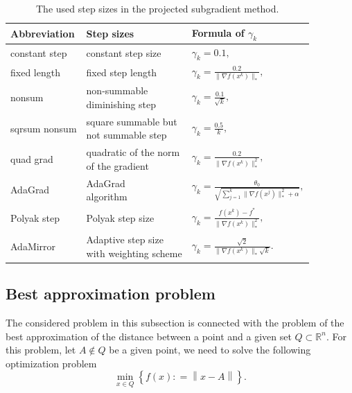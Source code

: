 \documentclass[11pt]{amsart}
\theoremstyle{definition}
\numberwithin{equation}{section}
\begin{document}
\begin{table}[htp]
\begin{tabular}{l l l }
\hline
Abbreviation & Step sizes  & Formula of $\gamma_k$ \\ \hline\hline
constant step & constant step size \cite{Boyd2004Subgradient} & $\gamma_k = 0.1,$ \\ \hline
fixed length  & fixed step length \cite{Boyd2004Subgradient} & $\gamma_k = \frac{0.2}{\|\nabla f(x^k)\|_*},$ \\ \hline
nonsum        &
\shortstack{non-summable \\ diminishing step \cite{Boyd2004Subgradient}}    & $\gamma_k = \frac{0.1}{\sqrt{k}},$ \\ \hline
sqrsum nonsum & 
\shortstack{square summable but \\ not summable step \cite{Boyd2004Subgradient}}
  & $\gamma_k = \frac{0.5}{k},$ \\ \hline
quad grad     & \shortstack{quadratic of the norm \\ of the gradient \cite{FedorRolandbook}}  & $\gamma_k = \frac{0.2}{\|\nabla f(x^k)\|_*^2},$ \\ \hline
AdaGrad       & \shortstack{AdaGrad \\ algorithm \cite{Duchi2011Adaptive}}   & $\gamma_k =  \frac{\theta_0}{\sqrt{\sum_{j = 1}^{k} \|\nabla f(x^j)\|_*^2 + \alpha}}, $ \\ \hline
Polyak step   & Polyak step size \cite{Polyak1987book} & $\gamma_k = \frac{f(x^k) - f^*}{\|\nabla f(x^k)\|_*^2},$  \\ \hline
AdaMirror & \shortstack{Adaptive step size \cite{moh2024asmaa} \\
with weighting scheme} & $\gamma_k = \frac{\sqrt{2}}{\|\nabla f(x^k)\|_* \sqrt{k}}.$ \\ \hline\hline
\end{tabular}
\caption{The used step sizes in the projected subgradient method.}
\label{Tab_steps}
\end{table}

\subsection{Best approximation problem}

The considered problem in this subsection is connected with the problem of the best approximation of the distance between a point and a given set $Q\subset \mathbb{R}^n $. For this problem, let $A \notin  Q$ be a given point, we need to solve the following optimization problem
\begin{equation}\label{best_approx_prob}
    \min_{x \in Q}\left\{ f(x) : = \left\|x - A\right\| \right\}. 
\end{equation}
\end{document}
